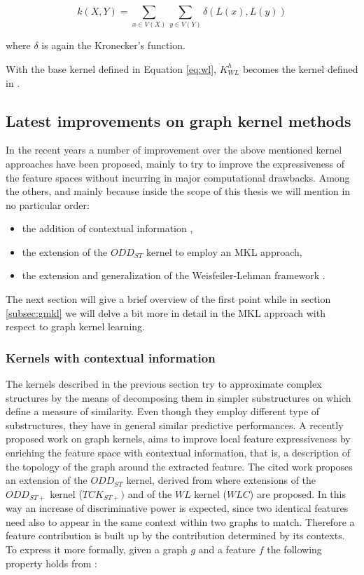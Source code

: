 \begin{equation}
    k(X,Y) = \sum_{x \in V(X)}\sum_{y \in V(Y)} \delta(L(x),L(y))
    \label{eq:wl}
\end{equation}

where $\delta$ is again the Kronecker's function.

With the base kernel defined in Equation \ref{eq:wl}, $K_{WL}^h$ becomes the
kernel defined in \cite{NIPS2009_3813}.

\subsection{Latest improvements on graph kernel methods}
\label{subsec:kernel}
In the recent years a number of improvement over the above mentioned kernel approaches
have been proposed, mainly to try to improve the expressiveness of the feature
spaces without incurring in major computational drawbacks.
Among the others, and mainly because inside the scope of this thesis we will
mention in no particular order:
\begin{itemize}
    \item the addition of contextual information \cite{Navarin2015},
    \item the extension of the $ODD_{ST}$ kernel to employ an MKL approach,
    \item the extension and generalization of the Weisfeiler-Lehman framework \cite{SanMartino2014}.
\end{itemize}

The next section will give a brief overview of the first point while in section
\ref{subsec:gmkl} we will delve a bit more in detail in the MKL approach
with respect to graph kernel learning.

\subsubsection{Kernels with contextual information}
\label{subsec:context}

The kernels described in the previous section try to approximate complex
structures by the means of decomposing them in simpler substructures on which
define a measure of similarity.
Even though they employ different type of substructures, they have in general
similar predictive performances.
A recently proposed work \cite{Navarin2015} on graph kernels, aims to improve local
feature expressiveness by enriching the feature space with contextual information,
that is, a description of the topology of the graph around the extracted feature.
The cited work proposes an extension of the $ODD_{ST}$ kernel, derived from
\cite{rtesselli} where extensions of the $ODD_{ST+}$ kernel ($TCK_{ST+})$ and of the $WL$
kernel ($WLC$) are proposed.
In this way an increase of discriminative power is expected, since two identical
features need also to appear in the same context within two graphs to match.
Therefore a feature contribution is built up by the contribution determined by
its contexts. To express it more formally, given a graph $g$ and a feature $f$
the following property holds from \cite{Navarin2015}:


